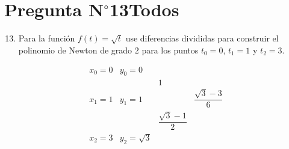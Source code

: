 \section{Pregunta N$^{\circ}$13\qquad Todos}

\begin{frame}
    \begin{enumerate}\setcounter{enumi}{12}
        \item

              Para la función
              \begin{math}
                  f\left(t\right)=
                  \sqrt{t}
              \end{math}
              use diferencias divididas para construir el polinomio
              de Newton de grado $2$ para los puntos $t_{0}=0$,
              $t_{1}=1$ y $t_{2}=3$.
    \end{enumerate}

    \begin{solution}
        \[
            \begin{array}{cccccc}
                x_0=0 & y_0=0                                                        \\
                      &              & 1                                             \\
                x_1=1 & y_1=1        &                       & \dfrac{\sqrt{3}-3}{6} \\
                      &              & \dfrac{\sqrt{3}-1}{2}                         \\
                x_2=3 & y_2=\sqrt{3}
            \end{array}
        \]
    \end{solution}
\end{frame}



